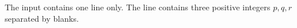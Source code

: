 The input contains one line only.
The line contains three positive integers $p,q,r$ separated by blanks.
